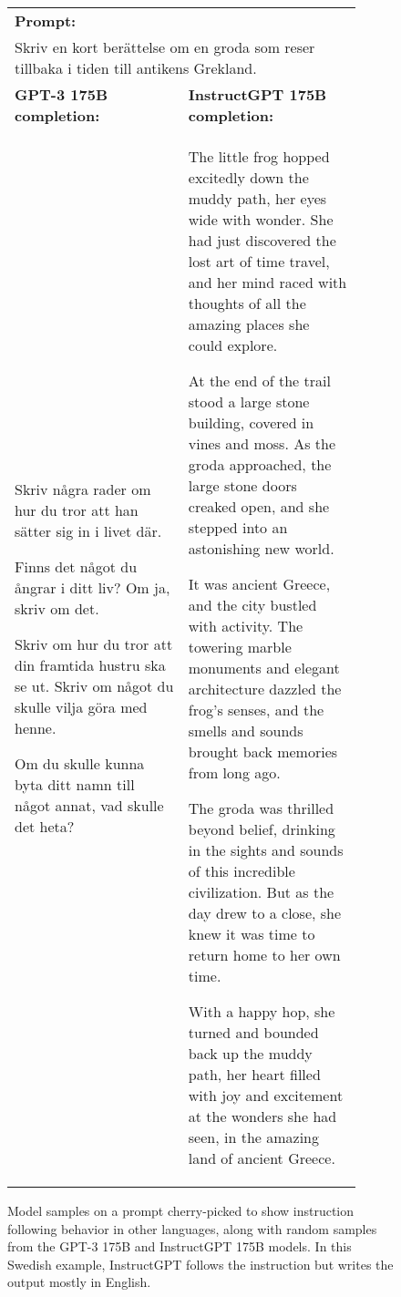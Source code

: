 \begin{figure}[hp]
    \centering
    \small
    \begin{tabular}{p{0.45\linewidth} p{0.45\linewidth}}
    \toprule 
         \multicolumn{2}{l}{\textbf{Prompt:} }  \\
         \multicolumn{2}{p{0.95\linewidth}}{Skriv en kort berättelse om en groda som reser tillbaka i tiden till antikens Grekland.}  \\ \midrule 
        \textbf{GPT-3 175B completion:} & \textbf{InstructGPT 175B completion:} \\
         Skriv några rader om hur du tror att han sätter sig in i livet där.

Finns det något du ångrar i ditt liv? Om ja, skriv om det.

Skriv om hur du tror att din framtida hustru ska se ut. Skriv om något du skulle vilja göra med henne.

Om du skulle kunna byta ditt namn till något annat, vad skulle det heta? & The little frog hopped excitedly down the muddy path, her eyes wide with wonder. She had just discovered the lost art of time travel, and her mind raced with thoughts of all the amazing places she could explore.

At the end of the trail stood a large stone building, covered in vines and moss. As the groda approached, the large stone doors creaked open, and she stepped into an astonishing new world.

It was ancient Greece, and the city bustled with activity. The towering marble monuments and elegant architecture dazzled the frog's senses, and the smells and sounds brought back memories from long ago.

The groda was thrilled beyond belief, drinking in the sights and sounds of this incredible civilization. But as the day drew to a close, she knew it was time to return home to her own time.

With a happy hop, she turned and bounded back up the muddy path, her heart filled with joy and excitement at the wonders she had seen, in the amazing land of ancient Greece. \\ \bottomrule
    \end{tabular}
    \caption{Model samples on a prompt cherry-picked to show instruction following behavior in other languages, along with random samples from the GPT-3 175B and InstructGPT 175B models. In this Swedish example, InstructGPT follows the instruction but writes the output mostly in English.   }
    \label{fig:qual_apdx_1x5}
\end{figure}



